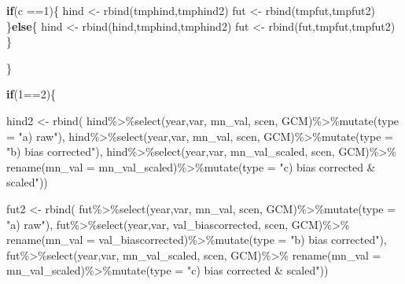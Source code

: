 \documentclass[
]{article}
\newenvironment{Shaded}{\begin{snugshade}}{\end{snugshade}}
\newcommand{\AttributeTok}[1]{\textcolor[rgb]{0.77,0.63,0.00}{#1}}
\newcommand{\ControlFlowTok}[1]{\textcolor[rgb]{0.13,0.29,0.53}{\textbf{#1}}}
\newcommand{\DecValTok}[1]{\textcolor[rgb]{0.00,0.00,0.81}{#1}}
\newcommand{\FunctionTok}[1]{\textcolor[rgb]{0.00,0.00,0.00}{#1}}
\newcommand{\NormalTok}[1]{#1}
\newcommand{\OtherTok}[1]{\textcolor[rgb]{0.56,0.35,0.01}{#1}}
\newcommand{\SpecialCharTok}[1]{\textcolor[rgb]{0.00,0.00,0.00}{#1}}
\newcommand{\StringTok}[1]{\textcolor[rgb]{0.31,0.60,0.02}{#1}}
\begin{document}
\begin{Shaded}
\begin{Highlighting}[]
       \ControlFlowTok{if}\NormalTok{(c }\SpecialCharTok{==}\DecValTok{1}\NormalTok{)\{}
\NormalTok{          hind  }\OtherTok{\textless{}{-}} \FunctionTok{rbind}\NormalTok{(tmphind,tmphind2)}
\NormalTok{          fut   }\OtherTok{\textless{}{-}} \FunctionTok{rbind}\NormalTok{(tmpfut,tmpfut2)}
\NormalTok{       \}}\ControlFlowTok{else}\NormalTok{\{}
\NormalTok{          hind  }\OtherTok{\textless{}{-}} \FunctionTok{rbind}\NormalTok{(hind,tmphind,tmphind2)}
\NormalTok{          fut   }\OtherTok{\textless{}{-}} \FunctionTok{rbind}\NormalTok{(fut,tmpfut,tmpfut2)}
\NormalTok{       \}}
       
\NormalTok{    \}}
    
    \ControlFlowTok{if}\NormalTok{(}\DecValTok{1}\SpecialCharTok{==}\DecValTok{2}\NormalTok{)\{}
         
\NormalTok{          hind2 }\OtherTok{\textless{}{-}} \FunctionTok{rbind}\NormalTok{(}
\NormalTok{            hind}\SpecialCharTok{\%\textgreater{}\%}\FunctionTok{select}\NormalTok{(year,var, mn\_val, scen, GCM)}\SpecialCharTok{\%\textgreater{}\%}\FunctionTok{mutate}\NormalTok{(}\AttributeTok{type =} \StringTok{"a) raw"}\NormalTok{),}
\NormalTok{            hind}\SpecialCharTok{\%\textgreater{}\%}\FunctionTok{select}\NormalTok{(year,var, mn\_val, scen, GCM)}\SpecialCharTok{\%\textgreater{}\%}\FunctionTok{mutate}\NormalTok{(}\AttributeTok{type =} \StringTok{"b) bias corrected"}\NormalTok{),}
\NormalTok{            hind}\SpecialCharTok{\%\textgreater{}\%}\FunctionTok{select}\NormalTok{(year,var, mn\_val\_scaled, scen, GCM)}\SpecialCharTok{\%\textgreater{}\%}
              \FunctionTok{rename}\NormalTok{(}\AttributeTok{mn\_val =}\NormalTok{ mn\_val\_scaled)}\SpecialCharTok{\%\textgreater{}\%}\FunctionTok{mutate}\NormalTok{(}\AttributeTok{type =} \StringTok{"c) bias corrected \&  scaled"}\NormalTok{))}
          
\NormalTok{          fut2 }\OtherTok{\textless{}{-}} \FunctionTok{rbind}\NormalTok{(}
\NormalTok{            fut}\SpecialCharTok{\%\textgreater{}\%}\FunctionTok{select}\NormalTok{(year,var, mn\_val, scen, GCM)}\SpecialCharTok{\%\textgreater{}\%}\FunctionTok{mutate}\NormalTok{(}\AttributeTok{type =} \StringTok{"a) raw"}\NormalTok{),}
\NormalTok{            fut}\SpecialCharTok{\%\textgreater{}\%}\FunctionTok{select}\NormalTok{(year,var, val\_biascorrected, scen, GCM)}\SpecialCharTok{\%\textgreater{}\%}
              \FunctionTok{rename}\NormalTok{(}\AttributeTok{mn\_val =}\NormalTok{ val\_biascorrected)}\SpecialCharTok{\%\textgreater{}\%}\FunctionTok{mutate}\NormalTok{(}\AttributeTok{type =} \StringTok{"b) bias corrected"}\NormalTok{),}
\NormalTok{            fut}\SpecialCharTok{\%\textgreater{}\%}\FunctionTok{select}\NormalTok{(year,var, mn\_val\_scaled, scen, GCM)}\SpecialCharTok{\%\textgreater{}\%}
              \FunctionTok{rename}\NormalTok{(}\AttributeTok{mn\_val =}\NormalTok{ mn\_val\_scaled)}\SpecialCharTok{\%\textgreater{}\%}\FunctionTok{mutate}\NormalTok{(}\AttributeTok{type =} \StringTok{"c) bias corrected \&  scaled"}\NormalTok{))}
         

\end{Highlighting}
\end{Shaded}
\end{document}
